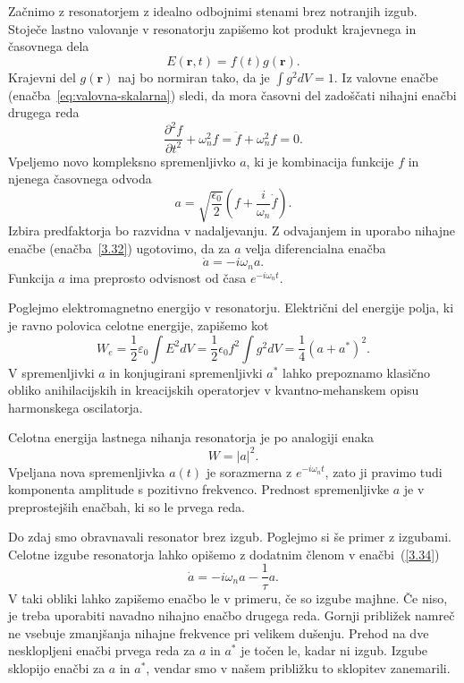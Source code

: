 Začnimo z resonatorjem z idealno odbojnimi stenami brez notranjih izgub. Stoječe
lastno valovanje v resonatorju zapišemo kot produkt krajevnega in časovnega
dela
\begin{equation}
E(\mathbf{r},t)=f(t)g(\mathbf{r}).
\label{3.31}
\end{equation}
Krajevni del $g(\mathbf{r})$ naj bo normiran tako, da je $\int g^{2}dV=1$. Iz valovne
enačbe (enačba~\ref{eq:valovna-skalarna}) sledi, da mora časovni del zadoščati 
nihajni enačbi drugega reda
\begin{equation}
\frac{\partial^2 f}{\partial t^2}+\omega_{n}^{2}f= \ddot{f} + \omega_{n}^{2}f=0.
\label{3.32}
\end{equation}
Vpeljemo novo kompleksno spremenljivko $a$, ki je kombinacija funkcije $f$ in njenega
časovnega odvoda
\begin{equation}
a=\sqrt{\frac{\epsilon_{0}}{2}}(f+\frac{i}{\omega_{n}}\dot{f}).
\label{3.33}
\end{equation}
Izbira predfaktorja bo razvidna v nadaljevanju. 
Z odvajanjem in uporabo nihajne enačbe (enačba~\ref{3.32}) ugotovimo, da za $a$ velja 
diferencialna enačba 
\begin{equation}
\dot{a}=-i\omega_{n}a.
\label{3.34}
\end{equation}
Funkcija $a$ ima preprosto odvisnost od časa $e^{-i\omega_{n}t}$. 

Poglejmo elektromagnetno energijo v resonatorju. Električni
del energije polja, ki je ravno polovica celotne energije, zapišemo kot
\begin{equation}
W_e = \frac{1}{2}\varepsilon_0 \int E^2 dV = \frac{1}{2}\epsilon_{0}f^{2}
\int g^{2}dV = \frac{1}{4} (a+a^{*})^2.
\end{equation}
V spremenljivki $a$ in konjugirani spremenljivki $a^{*}$ lahko prepoznamo 
klasično obliko anihilacijskih in kreacijskih operatorjev v kvantno-mehanskem 
opisu harmonskega oscilatorja. 

Celotna energija lastnega nihanja resonatorja je po analogiji enaka
\begin{equation}
W=|a|^2.
\label{3.35}
\end{equation}
Vpeljana nova spremenljivka $a(t)$ je sorazmerna z $e^{-i\omega_{n}t}$, 
zato ji pravimo tudi komponenta amplitude s pozitivno frekvenco. 
Prednost spremenljivke $a$ je v preprostejših enačbah, ki so le prvega reda. 

Do zdaj smo obravnavali resonator brez izgub. 
Poglejmo si še primer z izgubami. 
Celotne izgube resonatorja lahko opišemo z dodatnim členom v enačbi~(\ref{3.34})
\begin{equation}
\dot{a}=-i\omega_{n}a-\frac{1}{\tau}a.
\label{3.36}
\end{equation}
V taki obliki lahko zapišemo enačbo le v primeru, če so izgube majhne. Če niso, 
je treba uporabiti navadno nihajno enačbo drugega reda. Gornji približek
namreč ne vsebuje zmanjšanja nihajne frekvence pri velikem dušenju.
Prehod na dve nesklopljeni enačbi prvega reda za $a$ in $a^*$
je točen le, kadar ni izgub. Izgube sklopijo enačbi za $a$ in $a^{\ast}$, 
vendar smo v našem približku to sklopitev zanemarili.


